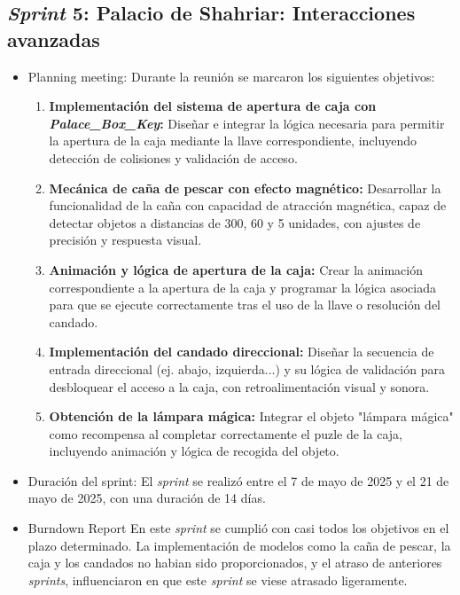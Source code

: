 \subsection{\textbf{\textit{Sprint} 5: Palacio de Shahriar: Interacciones avanzadas }}
\begin{itemize}
\item {Planning meeting}:
Durante la reunión se marcaron los siguientes objetivos:

\begin{enumerate}
\item \textbf{Implementación del sistema de apertura de caja con \textit{Palace\_Box\_Key}:}  
  Diseñar e integrar la lógica necesaria para permitir la apertura de la caja mediante la llave correspondiente, incluyendo detección de colisiones y validación de acceso.

\item \textbf{Mecánica de caña de pescar con efecto magnético:}  
  Desarrollar la funcionalidad de la caña con capacidad de atracción magnética, capaz de detectar objetos a distancias de 300, 60 y 5 unidades, con ajustes de precisión y respuesta visual.

\item \textbf{Animación y lógica de apertura de la caja:}  
  Crear la animación correspondiente a la apertura de la caja y programar la lógica asociada para que se ejecute correctamente tras el uso de la llave o resolución del candado.

\item \textbf{Implementación del candado direccional:}  
  Diseñar la secuencia de entrada direccional (ej. abajo, izquierda...) y su lógica de validación para desbloquear el acceso a la caja, con retroalimentación visual y sonora.

\item \textbf{Obtención de la lámpara mágica:}  
  Integrar el objeto "lámpara mágica" como recompensa al completar correctamente el puzle de la caja, incluyendo animación y lógica de recogida del objeto.
\end{enumerate}

    \item {Duración del sprint:}
El \textit{sprint } se realizó entre el 7 de mayo de 2025 y el 21 de mayo de 2025, con una duración de 14 días.

    \item {Burndown Report}
En este \textit{sprint} se cumplió con casi todos los objetivos en el plazo determinado. La implementación de modelos como la caña de pescar, la caja y los candados no habian sido proporcionados, y el atraso de anteriores \textit{sprints}, influenciaron en que este \textit{sprint} se viese atrasado ligeramente.


\end{itemize}
